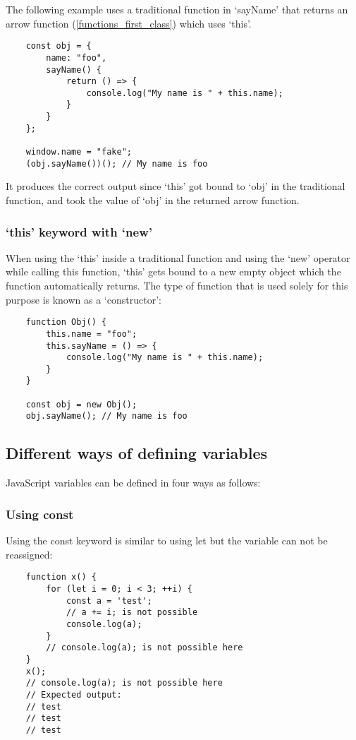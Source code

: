 \documentclass[11pt,a4paper]{article}
\begin{document}
The following example uses a traditional function in `sayName' that
returns an arrow function (\ref{functions_first_class}) which uses `this'.
\begin{verbatim}
    const obj = {
        name: "foo",
        sayName() {
            return () => {
                console.log("My name is " + this.name);
            }
        }
    };

    window.name = "fake";
    (obj.sayName())(); // My name is foo
\end{verbatim}
It produces the correct output since `this' got bound to `obj' in the traditional function,
and took the value of `obj' in the returned arrow function.

\subsubsection{\label{new_keyword}`this' keyword with `new'}
When using the `this' inside a traditional function and using the `new' operator while calling this function,
`this' gets bound to a new empty object which the function automatically returns.
The type of function that is used solely for this purpose is known as a `constructor':
\begin{verbatim}
    function Obj() {
        this.name = "foo";
        this.sayName = () => {
            console.log("My name is " + this.name);
        }
    }

    const obj = new Obj();
    obj.sayName(); // My name is foo
\end{verbatim}

\subsection{\label{defining_variables}Different ways of defining variables}
JavaScript variables can be defined in four ways as follows:

\subsubsection{Using const}
Using the const keyword is similar to using let but the variable can not be reassigned:
\begin{verbatim}
    function x() {
        for (let i = 0; i < 3; ++i) {
            const a = 'test';
            // a += i; is not possible
            console.log(a);
        }
        // console.log(a); is not possible here
    }
    x();
    // console.log(a); is not possible here
    // Expected output:
    // test
    // test
    // test
\end{verbatim}
\end{document}
